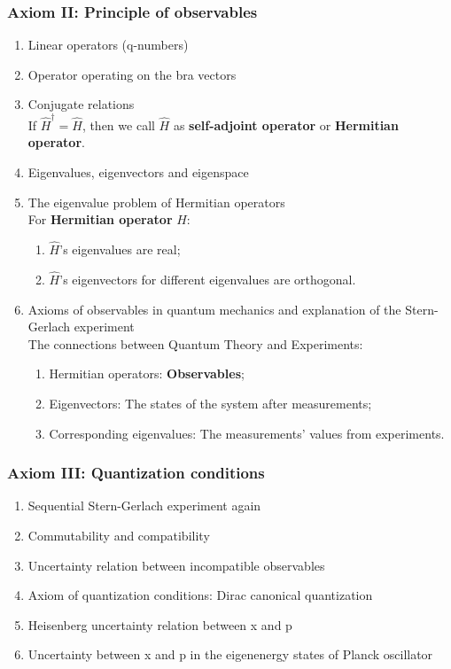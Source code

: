 \documentclass[12pt]{article}
\numberwithin{equation}{section}
\begin{document}
\subsubsection{Axiom II: Principle of observables}
\begin{enumerate}
\item Linear operators (q-numbers)
\item Operator operating on the bra vectors
\item Conjugate relations \\
	If $\hat{H}^\dag=\hat{H}$, then we call $\hat{H}$ as \textbf{self-adjoint operator} or \textbf{Hermitian operator}.
\item Eigenvalues, eigenvectors and eigenspace
\item The eigenvalue problem of Hermitian operators \\
	For \textbf{Hermitian operator} $\hat{H}$:
	\begin{enumerate}
	\item $\hat{H}$'s eigenvalues are real;
	\item $\hat{H}$'s eigenvectors for different eigenvalues are orthogonal.
	\end{enumerate}
\item Axioms of observables in quantum mechanics and explanation of the Stern-Gerlach experiment \\
	The connections between Quantum Theory and Experiments:
	\begin{enumerate}
	\item Hermitian operators: \textbf{Observables};  
	\item Eigenvectors: The states of the system after measurements;
	\item Corresponding eigenvalues: The measurements' values from experiments.
	\end{enumerate}
\end{enumerate}
\subsubsection{Axiom III: Quantization conditions}
\begin{enumerate}
\item Sequential Stern-Gerlach experiment again
\item Commutability and compatibility
\item Uncertainty relation between incompatible observables
\item Axiom of quantization conditions: Dirac canonical quantization
\item Heisenberg uncertainty relation between x and p
\item Uncertainty between x and p in the eigenenergy states of Planck oscillator
\end{enumerate}
\end{document}
